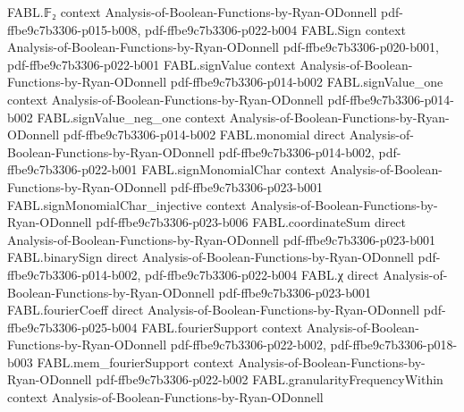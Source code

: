 \begin{theorem}
\label{FABL.expect_affineSubspaceRestriction_eq_sum}
\leanok
{}
\proofstep
  {FABL.𝔽₂}
  {context}
  {Analysis-of-Boolean-Functions-by-Ryan-ODonnell}
  {pdf-ffbe9c7b3306-p015-b008,
    pdf-ffbe9c7b3306-p022-b004}
\proofstep
  {FABL.Sign}
  {context}
  {Analysis-of-Boolean-Functions-by-Ryan-ODonnell}
  {pdf-ffbe9c7b3306-p020-b001,
    pdf-ffbe9c7b3306-p022-b001}
\proofstep
  {FABL.signValue}
  {context}
  {Analysis-of-Boolean-Functions-by-Ryan-ODonnell}
  {pdf-ffbe9c7b3306-p014-b002}
\proofstep
  {FABL.signValue_one}
  {context}
  {Analysis-of-Boolean-Functions-by-Ryan-ODonnell}
  {pdf-ffbe9c7b3306-p014-b002}
\proofstep
  {FABL.signValue_neg_one}
  {context}
  {Analysis-of-Boolean-Functions-by-Ryan-ODonnell}
  {pdf-ffbe9c7b3306-p014-b002}
\proofstep
  {FABL.monomial}
  {direct}
  {Analysis-of-Boolean-Functions-by-Ryan-ODonnell}
  {pdf-ffbe9c7b3306-p014-b002,
    pdf-ffbe9c7b3306-p022-b001}
\proofstep
  {FABL.signMonomialChar}
  {context}
  {Analysis-of-Boolean-Functions-by-Ryan-ODonnell}
  {pdf-ffbe9c7b3306-p023-b001}
\proofstep
  {FABL.signMonomialChar_injective}
  {context}
  {Analysis-of-Boolean-Functions-by-Ryan-ODonnell}
  {pdf-ffbe9c7b3306-p023-b006}
\proofstep
  {FABL.coordinateSum}
  {direct}
  {Analysis-of-Boolean-Functions-by-Ryan-ODonnell}
  {pdf-ffbe9c7b3306-p023-b001}
\proofstep
  {FABL.binarySign}
  {direct}
  {Analysis-of-Boolean-Functions-by-Ryan-ODonnell}
  {pdf-ffbe9c7b3306-p014-b002,
    pdf-ffbe9c7b3306-p022-b004}
\proofstep
  {FABL.χ}
  {direct}
  {Analysis-of-Boolean-Functions-by-Ryan-ODonnell}
  {pdf-ffbe9c7b3306-p023-b001}
\proofstep
  {FABL.fourierCoeff}
  {direct}
  {Analysis-of-Boolean-Functions-by-Ryan-ODonnell}
  {pdf-ffbe9c7b3306-p025-b004}
\proofstep
  {FABL.fourierSupport}
  {context}
  {Analysis-of-Boolean-Functions-by-Ryan-ODonnell}
  {pdf-ffbe9c7b3306-p022-b002,
    pdf-ffbe9c7b3306-p018-b003}
\proofstep
  {FABL.mem_fourierSupport}
  {context}
  {Analysis-of-Boolean-Functions-by-Ryan-ODonnell}
  {pdf-ffbe9c7b3306-p022-b002}
\proofstep
  {FABL.granularityFrequencyWithin}
  {context}
  {Analysis-of-Boolean-Functions-by-Ryan-ODonnell}

\end{theorem}
